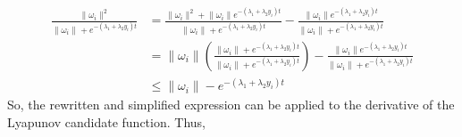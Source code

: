    \begin{equation*}
        \begin{align}
            \frac{\lVert \omega_i \rVert^2}{\lVert \omega_i \rVert + e^{-\left(\lambda_1 + \lambda_2 y_i\right)t}} &= \frac{\lVert \omega_i \rVert^2 + \lVert \omega_i \rVert e^{-\left(\lambda_1 + \lambda_2 y_i\right)t}}{\lVert \omega_i \rVert + e^{-\left(\lambda_1 + \lambda_2 y_i\right)t}} - \frac{\lVert \omega_i \rVert e^{-\left(\lambda_1 + \lambda_2 y_i\right)t}}{\lVert \omega_i \rVert + e^{-\left(\lambda_1 + \lambda_2 y_i\right)t}}\\
            &= \lVert \omega_i \rVert \left(\frac{\lVert \omega_i \rVert + e^{-\left(\lambda_1 + \lambda_2 y_i\right)t}}{\lVert \omega_i \rVert + e^{-\left(\lambda_1 + \lambda_2 y_i\right)t}}\right) - \frac{\lVert \omega_i \rVert e^{-\left(\lambda_1 + \lambda_2 y_i\right)t}}{\lVert \omega_i \rVert + e^{-\left(\lambda_1 + \lambda_2 y_i\right)t}}\\
            & \leq \lVert \omega_i \rVert - e^{-(\lambda_1 + \lambda_2 y_i)t}
        \end{align}
   \end{equation*}
   So, the rewritten and simplified expression can be applied to the derivative of the Lyapunov candidate function. Thus,
